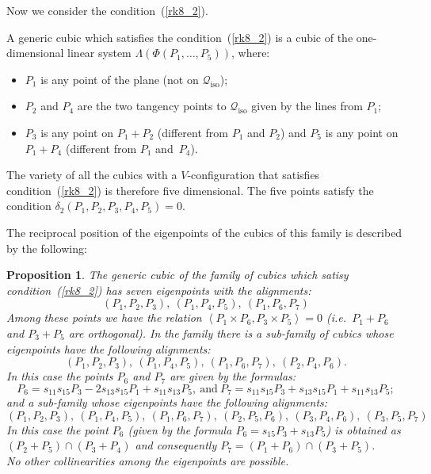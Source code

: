 \documentclass{amsart}
\theoremstyle{plain}
\newtheorem{prop}[lemma]{Proposition}
\theoremstyle{definition}
\newcommand{\iso}{\mathcal{Q}_{\mathrm{iso}}}
\newcommand{\scl}[2]{\left\langle {#1}, {#2} \right\rangle}
\begin{document}
Now we consider the condition~(\ref{rk8_2}).

%
A generic cubic which satisfies the condition~(\ref{rk8_2}) is
a cubic of the one-dimensional linear system
$\Lambda(\Phi(P_1, \dotsc, P_5))$, where:
\begin{itemize}
\item $P_1$ is any point of the plane (not on $\iso$);
\item $P_2$ and $P_4$ are the two tangency points to $\iso$ given by the lines
from $P_1$;
\item $P_3$ is any point on  $P_1+P_2$ (different from $P_1$ and $P_2$)
and $P_5$ is any point on $P_1+P_4$ (different from $P_1$ and~$P_4$).
\end{itemize}

The variety of all the cubics with a $V$-configuration
that
satisfies condition~(\ref{rk8_2}) is therefore five dimensional.
The five points satisfy the condition $\delta_2(P_1, P_2, P_3, P_4, P_5) = 0$.


The reciprocal position of the eigenpoints of the cubics of this family
is described by the following:
%
\begin{prop}
\label{prop:rk8_2B}
The generic cubic of the family of cubics which satisy condition~(\ref{rk8_2})
has seven eigenpoints with the alignments:
\[
(P_1, P_2, P_3), \ (P_1, P_4, P_5), \ (P_1, P_6, P_7)
\]
Among these points we have the relation
$\scl{P_1 \times P_6}{P_3\times P_5}=0$
(i.e.\ $P_1+P_6$ and $P_3+P_5$ are orthogonal).
In the family there is a sub-family of cubics
whose eigenpoints have the following
alignments:
\[
(P_1, P_2, P_3),\  (P_1, P_4, P_5),\  (P_1, P_6, P_7),\  (P_2, P_4, P_6).
\]
In this case the points $P_6$ and $P_7$ are given by the formulas:
\[P_6 = s_{11}s_{15}P_3-2s_{13}s_{15}P_1+s_{11}s_{13}P_5, \ \mbox{and} \
P_7 = s_{11}s_{15}P_3+s_{13}s_{15}P_1+s_{11}s_{13}P_5;
\]
and a sub-family whose eigenpoints have the following
alignments:
\[
(P_1, P_2, P_3),\  (P_1, P_4, P_5), \ (P_1, P_6, P_7),\  (P_2, P_5, P_6),\
(P_3, P_4, P_6),\  (P_3, P_5, P_7)
\]
In this case the point $P_6$ (given by the formula
$P_6 = s_{15}P_3+s_{13}P_5$) is obtained as
$(P_2+P_5) \cap (P_3+P_4)$ and consequently
$P_7 = (P_1+P_6) \cap (P_3+P_5)$.\\
No other collinearities among the eigenpoints are possible.
\end{prop}
\end{document}
